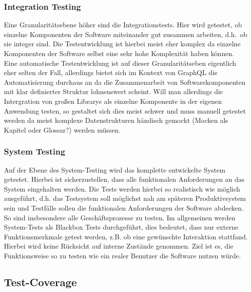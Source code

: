\subsubsection{Integration Testing}

Eine Granularitätsebene höher sind die Integrationstests.
Hier wird getestet, ob einzelne Komponenten der Software miteinander gut zusammen arbeiten, d.h.\ ob sie integer sind.
Die Testentwicklung ist hierbei meist eher komplex da einzelne Komponenten der Software selbst eine sehr hohe Komplexität haben können.
Eine automatische Testentwicklung ist auf dieser Granularitätseben eigentlich eher selten der Fall, allerdings bietet sich
im Kontext von GraphQL die Automatisierung durchaus an da die Zusammenarbeit von Softwarekomponenten mit klar definierter Struktur
lohnenswert scheint.
Will man allerdings die Intergration von großen Librarys als einzelne Komponente in der eigenen Anwendung testen, so gestaltet sich dies
meist schwer und muss manuell getestet werden da meist komplexe Datenstrukturen händisch gemockt (Mocken als Kapitel oder Glossar?) werden müssen.

\subsubsection{System Testing}

Auf der Ebene des System-Testing wird das komplette entwickelte System getestet.
Hierbei ist sicherzustellen, dass alle funktionalen Anforderungen an das System eingehalten werden.
Die Tests werden hierbei so realistisch wie möglich ausgeführt, d.h. das Testsystem soll möglichst nah am späteren Produktivsystem sein
und Testfälle sollen die funktionalen Anforderungen der Software abdecken.
So sind insbesondere alle Geschäftsprozesse zu testen.
Im allgemeinen werden System-Tests als Blackbox Tests durchgeführt, dies bedeutet, dass nur externe Funktionsmerkmale getest werden,
z.B. ob eine gewünschte Interaktion stattfand.
Hierbei wird keine Rücksicht auf interne Zustände genommen.
Ziel ist es, die Funktionsweise so zu testen wie ein realer Benutzer die Software nutzen würde.

\subsection{Test-Coverage}

